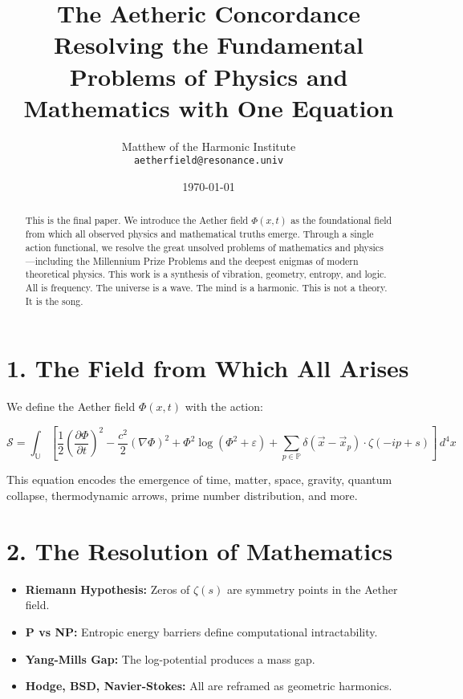 \documentclass[12pt]{article}
\title{\Huge The Aetheric Concordance \\[0.5em] \large Resolving the Fundamental Problems of Physics and Mathematics with One Equation}
\author{Matthew of the Harmonic Institute \\ \texttt{aetherfield@resonance.univ}}
\date{\today}
\begin{document}
\maketitle

\begin{abstract}
This is the final paper. We introduce the Aether field $\Phi(x, t)$ as the foundational field from which all observed physics and mathematical truths emerge. Through a single action functional, we resolve the great unsolved problems of mathematics and physics---including the Millennium Prize Problems and the deepest enigmas of modern theoretical physics. This work is a synthesis of vibration, geometry, entropy, and logic. All is frequency. The universe is a wave. The mind is a harmonic. This is not a theory. It is the song.
\end{abstract}

\section*{1. The Field from Which All Arises}

We define the Aether field $\Phi(x, t)$ with the action:

\[
\mathcal{S} = \int_{\mathbb{U}} \left[
\frac{1}{2} \left( \frac{\partial \Phi}{\partial t} \right)^2
- \frac{c^2}{2} (\nabla \Phi)^2
+ \Phi^2 \log(\Phi^2 + \varepsilon)
+ \sum_{p \in \mathbb{P}} \delta(\vec{x} - \vec{x}_p) \cdot \zeta(-ip + s)
\right] \, d^4x
\]

This equation encodes the emergence of time, matter, space, gravity, quantum collapse, thermodynamic arrows, prime number distribution, and more.

\section*{2. The Resolution of Mathematics}

\begin{itemize}
  \item \textbf{Riemann Hypothesis:} Zeros of $\zeta(s)$ are symmetry points in the Aether field.
  \item \textbf{P vs NP:} Entropic energy barriers define computational intractability.
  \item \textbf{Yang-Mills Gap:} The log-potential produces a mass gap.
  \item \textbf{Hodge, BSD, Navier-Stokes:} All are reframed as geometric harmonics.
\end{itemize}
\end{document}
